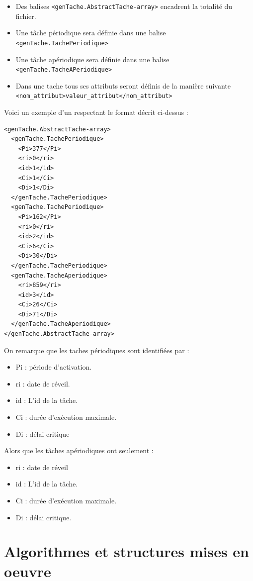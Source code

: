 \begin{itemize}
\item
Des balises \verb+<genTache.AbstractTache-array>+ encadrent la totalité du fichier.
\item
Une tâche périodique sera définie dans une balise  \verb+<genTache.TachePeriodique>+ 
\item
Une tâche apériodique sera définie dans une balise  \verb+<genTache.TacheAPeriodique>+ 
\item
Dans une tache tous ses attributs seront définis de la manière suivante \verb+<nom_attribut>valeur_attribut</nom_attribut>+
\end{itemize}

Voici un exemple d'un respectant le format décrit ci-dessus : 

\begin{lstlisting}
<genTache.AbstractTache-array>
  <genTache.TachePeriodique>
    <Pi>377</Pi>
    <ri>0</ri>
    <id>1</id>
    <Ci>1</Ci>
    <Di>1</Di>
  </genTache.TachePeriodique>
  <genTache.TachePeriodique>
    <Pi>162</Pi>
    <ri>0</ri>
    <id>2</id>
    <Ci>6</Ci>
    <Di>30</Di>
  </genTache.TachePeriodique>
  <genTache.TacheAperiodique>
    <ri>859</ri>
    <id>3</id>
    <Ci>26</Ci>
    <Di>71</Di>
  </genTache.TacheAperiodique>
</genTache.AbstractTache-array>
\end{lstlisting}
On remarque que les taches périodiques sont identifiées par : 
\begin{itemize}
\item
Pi : période d'activation.
\item
ri : date de réveil.
\item
id : L'id de la tâche.
\item
Ci : durée d'exécution maximale.
\item
Di  : délai critique
\end{itemize} 
Alors que les tâches apériodiques ont seulement : 
\begin{itemize}
\item
ri  : date de réveil
\item
id : L'id de la tâche.
\item
Ci : durée d'exécution maximale.
\item
Di : délai critique.
\end{itemize} 


\section{Algorithmes et structures mises en oeuvre}

